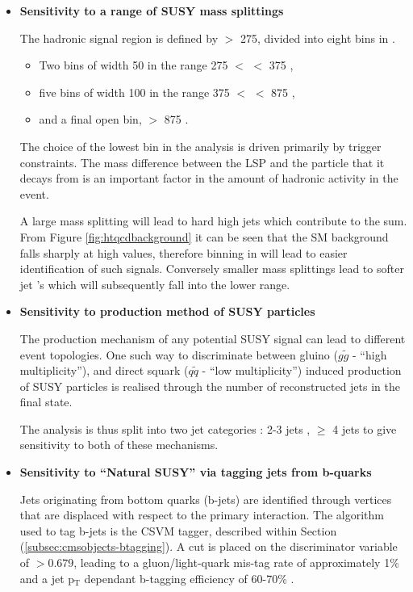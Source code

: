 \begin{itemize}

\item[] \textbf{Sensitivity to a range of \ac{SUSY} mass splittings}

The hadronic signal region is defined by \theht $>$ 275, divided into eight bins in \theht. 

\begin{itemize}
\item Two bins of width 50 \GeV in the range 275 $<$ \theht $<$ 375 \GeV,
\item five bins of width 100 \GeV in the range 375 $<$ \theht$<$ 875 \GeV,
\item and a final open bin, \theht $>$ 875 \GeV.
\end{itemize}

The choice of the lowest \theht bin in the analysis is driven primarily by trigger constraints. The mass difference between the \ac{LSP} and the particle that it decays from is an important factor in the amount of hadronic activity in the event. 

A large mass splitting will lead to hard high \pt jets which contribute to the \theht sum. From Figure \ref{fig:htqcdbackground} it can be seen that the \ac{SM} background falls sharply at high \theht values, therefore binning in \theht will lead to easier identification of such signals. Conversely smaller mass splittings lead to softer jet \pt's which will subsequently fall into the lower \theht range.

\item[] \textbf{Sensitivity to production method of \ac{SUSY} particles}

The production mechanism of any potential \ac{SUSY} signal can lead to different event topologies. One such way to discriminate between gluino ($g\widetilde{g}$ - ``high multiplicity''), and direct squark ($q\widetilde{q}$ - ``low multiplicity'') induced production of \ac{SUSY} particles is realised through the number of reconstructed jets in the final state.  

The analysis is thus split into two jet categories : 2-3 jets , $\geq$ 4 jets to give sensitivity to both of these mechanisms. 

\item[] \textbf{Sensitivity to  ``Natural \ac{SUSY}'' via tagging jets from b-quarks}

Jets originating from bottom quarks (b-jets) are identified through vertices that are displaced with respect to the primary interaction. The algorithm used to tag b-jets is the \acf{CSVM} tagger, described within Section (\ref{subsec:cmsobjects-btagging}). A cut is placed on the discriminator variable of $> 0.679$, leading to a gluon/light-quark mis-tag rate of approximately 1\% and a jet p$_{\text{T}}$ dependant b-tagging efficiency of 60-70\% \cite{btag8tev}.


\end{itemize}
